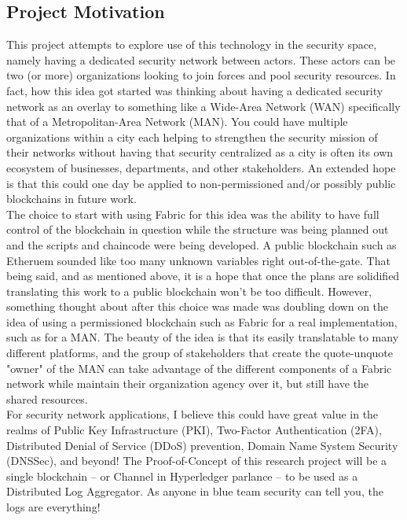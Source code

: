 	\subsection{Project Motivation}
		\hspace{10mm}This project attempts to explore use of this technology in the security space, namely having a dedicated security network between actors. These actors can be two (or more) organizations looking to join forces and pool security resources. In fact, how this idea got started was thinking about having a dedicated security network as an overlay to something like a Wide-Area Network (WAN) specifically that of a Metropolitan-Area Network (MAN). You could have multiple organizations within a city each helping to strengthen the security mission of their networks without having that security centralized as a city is often its own ecosystem of businesses, departments, and other stakeholders. An extended hope is that this could one day be applied to non-permissioned and/or possibly public blockchains in future work.\\
	
		\hspace{10mm}The choice to start with using Fabric for this idea was the ability to have full control of the blockchain in question while the structure was being planned out and the scripts and chaincode were being developed. A public blockchain such as Etheruem sounded like too many unknown variables right out-of-the-gate. That being said, and as mentioned above, it is a hope that once the plans are solidified translating this work to a public blockchain won't be too difficult. However, something thought about after this choice was made was doubling down on the idea of using a permissioned blockchain such as Fabric for a real implementation, such as for a MAN. The beauty of the idea is that its easily translatable to many different platforms, and the group of stakeholders that create the quote-unquote "owner" of the MAN can take advantage of the different components of a Fabric network while maintain their organization agency over it, but still have the shared resources.\\
		
		For security network applications, I believe this could have great value in the realms of Public Key Infrastructure (PKI), Two-Factor Authentication (2FA), Distributed Denial of Service (DDoS) prevention, Domain Name System Security (DNSSec), and beyond! The Proof-of-Concept of this research project will be a single blockchain -- or Channel in Hyperledger parlance -- to be used as a Distributed Log Aggregator. As anyone in blue team security can tell you, the logs are everything!\\
	
